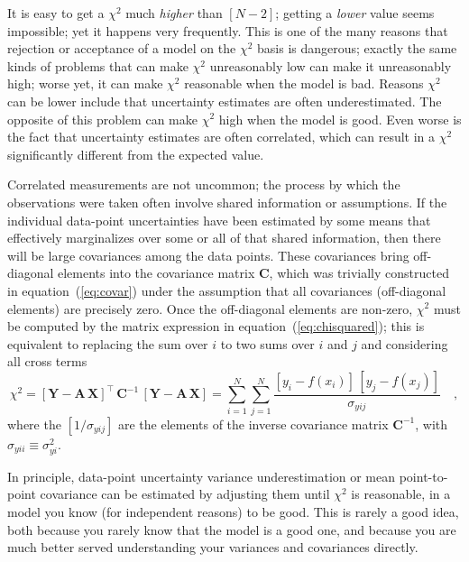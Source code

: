 \documentclass[12pt,twoside]{article}
\newcommand{\equationname}{equation}
\newcounter{problem}
\newcommand{\mmatrix}[1]{\boldsymbol{#1}}
\newcommand{\inverse}[1]{{#1}^{-1}}
\newcommand{\transpose}[1]{{#1}^{\scriptscriptstyle \top}}
\newcommand{\mA}{\mmatrix{A}}
\newcommand{\mC}{\mmatrix{C}}
\newcommand{\mCinv}{\inverse{\mC}}
\newcommand{\mX}{\mmatrix{X}}
\newcommand{\mY}{\mmatrix{Y}}
\begin{document}
It is easy to get a $\chi^2$ much \emph{higher} than $[N-2]$; getting
a \emph{lower} value seems impossible; yet it happens very frequently.
This is one of the many reasons that rejection or acceptance of a
model on the $\chi^2$ basis is dangerous; exactly the same kinds of
problems that can make $\chi^2$ unreasonably low can make it
unreasonably high; worse yet, it can make $\chi^2$ reasonable when the
model is bad.  Reasons $\chi^2$ can be lower include that uncertainty
estimates are often underestimated. The opposite of this problem can
make $\chi^2$ high when the model is good. Even worse is the fact that
uncertainty estimates are often correlated, which can result in a
$\chi^2$ significantly different from the expected value.

Correlated measurements are not uncommon; the process by which the
observations were taken often involve shared information or
assumptions. If the individual data-point uncertainties have been
estimated by some means that effectively marginalizes over some or all
of that shared information, then there will be large covariances among
the data points.  These covariances bring off-diagonal elements into
the covariance matrix $\mC$, which was trivially constructed in
\equationname~(\ref{eq:covar}) under the assumption that all
covariances (off-diagonal elements) are precisely zero.  Once the
off-diagonal elements are non-zero, $\chi^2$ must be computed by the
matrix expression in \equationname~(\ref{eq:chisquared}); this is
equivalent to replacing the sum over $i$ to two sums over $i$ and $j$
and considering all cross terms
\begin{equation}
\chi^2 =
 \transpose{\left[\mY-\mA\,\mX\right]}\,\mCinv\,\left[\mY-\mA\,\mX\right]
 = \sum_{i=1}^N \sum_{j=1}^N
 \frac{\left[y_i-f(x_i)\right]\,[y_j-f(x_j)]}
 {\sigma_{yij}} \quad,
\end{equation} 
where the $[1/\sigma_{yij}]$ are the elements of the inverse covariance
matrix $\inverse{\mC}$, with $\sigma_{yii}\equiv\sigma_{yi}^2$.

In principle, data-point uncertainty variance underestimation or mean
point-to-point covariance can be estimated by adjusting them until
$\chi^2$ is reasonable, in a model you know (for independent reasons)
to be good.  This is rarely a good idea, both because you rarely know
that the model is a good one, and because you are much better served
understanding your variances and covariances directly.
\end{document}
